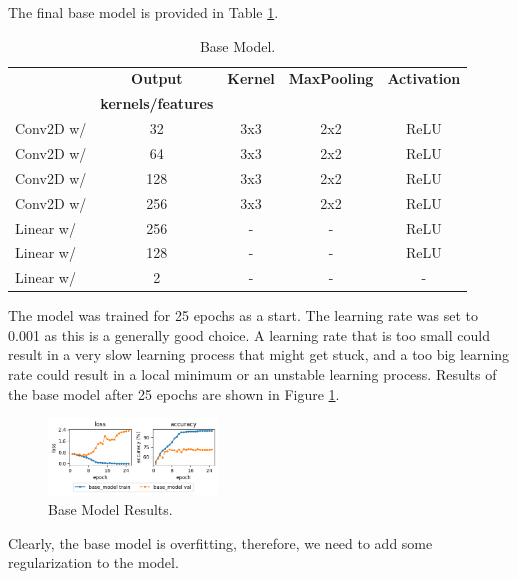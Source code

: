 The final base model is provided in Table \ref{tab:base_model}.
\begin{table}[H]
    \vspace*{-0.5cm}
    \centering
    \begin{tabular}{|l|c|c|c|c|}
    \hline
                & \textbf{Output}           & \textbf{Kernel}   & \textbf{MaxPooling}   & \textbf{Activation}   \\ 
                & \textbf{kernels/features} &                   &   &   \\ \hline
    Conv2D w/   & 32                        & 3x3                   & 2x2                   & ReLU                  \\ \hline
    Conv2D w/   & 64                        & 3x3                   & 2x2                   & ReLU                  \\ \hline
    Conv2D w/   & 128                       & 3x3                   & 2x2                   & ReLU                  \\ \hline
    Conv2D w/   & 256                       & 3x3                   & 2x2                   & ReLU                  \\ \hline
    Linear w/   & 256                       & -                     & -                     & ReLU                  \\ \hline
    Linear w/   & 128                       & -                     & -                     & ReLU                  \\ \hline
    Linear w/   & 2                         & -                     & -                     & -                     \\ \hline
    \end{tabular}
    \caption{Base Model.}
    \label{tab:base_model}
    \vspace*{-0.8cm}
\end{table}

The model was trained for 25 epochs as a start. The learning rate was set to 0.001 as this is a generally good choice. A learning rate that is too small could result in a very slow learning process that might get stuck, and a too big learning rate could result in a local minimum or an unstable learning process. Results of the base model after 25 epochs are shown in Figure \ref{fig:base_model_results}.
\begin{figure}[H]
    \vspace*{-0.7cm}
    \centering
    \includegraphics[width=0.4\textwidth]{figures/results_base_model.png}
    \caption{Base Model Results.}
    \label{fig:base_model_results}
    \vspace*{-0.7cm}
\end{figure}

Clearly, the base model is overfitting, therefore, we need to add some regularization to the model.